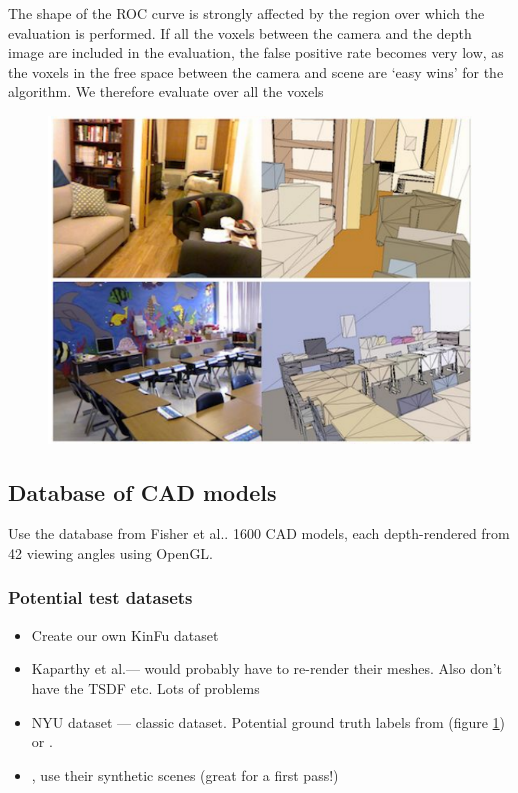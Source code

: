 \documentclass[10pt,twocolumn,letterpaper]{article}
\makeatletter
\newcommand*{\ea}{et al.\@\xspace}
\makeatother
\begin{document}
The shape of the ROC curve is strongly affected by the region over which the evaluation is performed.
If all the voxels between the camera and the depth image are included in the evaluation, the false positive rate becomes very low, as the voxels in the free space between the camera and scene are `easy wins' for the algorithm. We therefore evaluate over all the voxels 


\begin{figure}
    \centering%
    \includegraphics[width=1.0\columnwidth]{guo.png}%
    \label{fig:guo_labels}%
\end{figure}


\subsection{Database of CAD models}
Use the database from Fisher \ea \cite{fisher-siggraphasia-2012}.
1600 CAD models, each depth-rendered from 42 viewing angles using OpenGL.

\subsubsection{Potential test datasets}
\begin{itemize}
\item Create our own KinFu dataset
\item Kaparthy \ea --- would probably have to re-render their meshes.
Also don't have the TSDF etc. Lots of problems
\item NYU dataset --- classic dataset. Potential ground truth labels from \cite{guo-iccv-2013} (figure \ref{fig:guo_labels}) or \cite{kim-iccv-2013}.
\item \cite{fisher-siggraphasia-2012}, use their synthetic scenes (great for a first pass!)
\end{itemize}
\end{document}
